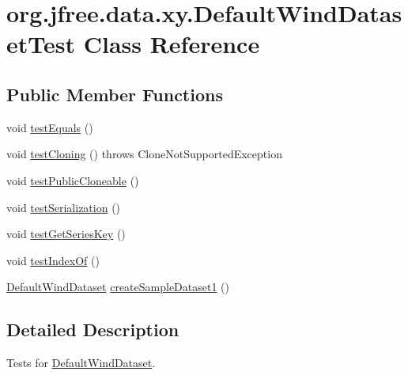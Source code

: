 \hypertarget{classorg_1_1jfree_1_1data_1_1xy_1_1_default_wind_dataset_test}{}\section{org.\+jfree.\+data.\+xy.\+Default\+Wind\+Dataset\+Test Class Reference}
\label{classorg_1_1jfree_1_1data_1_1xy_1_1_default_wind_dataset_test}
\subsection*{Public Member Functions}
\begin{DoxyCompactItemize}
\item 
void \mbox{\hyperlink{classorg_1_1jfree_1_1data_1_1xy_1_1_default_wind_dataset_test_abe0eb748788ebbc2cc8e919dec729cb5}{test\+Equals}} ()
\item 
void \mbox{\hyperlink{classorg_1_1jfree_1_1data_1_1xy_1_1_default_wind_dataset_test_a4309780877d71caf49d9fdcba3f53827}{test\+Cloning}} ()  throws Clone\+Not\+Supported\+Exception 
\item 
void \mbox{\hyperlink{classorg_1_1jfree_1_1data_1_1xy_1_1_default_wind_dataset_test_ae27efdcae80a0b05325d29e5b90580a1}{test\+Public\+Cloneable}} ()
\item 
void \mbox{\hyperlink{classorg_1_1jfree_1_1data_1_1xy_1_1_default_wind_dataset_test_af7359322d733fc31f7e4b0d6961b5f5d}{test\+Serialization}} ()
\item 
void \mbox{\hyperlink{classorg_1_1jfree_1_1data_1_1xy_1_1_default_wind_dataset_test_a6428465330487a2876dfcfe0f0191f0d}{test\+Get\+Series\+Key}} ()
\item 
void \mbox{\hyperlink{classorg_1_1jfree_1_1data_1_1xy_1_1_default_wind_dataset_test_a4ccfed828746ad2006d00b8e9dd9d849}{test\+Index\+Of}} ()
\item 
\mbox{\hyperlink{classorg_1_1jfree_1_1data_1_1xy_1_1_default_wind_dataset}{Default\+Wind\+Dataset}} \mbox{\hyperlink{classorg_1_1jfree_1_1data_1_1xy_1_1_default_wind_dataset_test_a491cc8d7093c4e448dc0197bc0acf6cf}{create\+Sample\+Dataset1}} ()
\end{DoxyCompactItemize}


\subsection{Detailed Description}
Tests for \mbox{\hyperlink{classorg_1_1jfree_1_1data_1_1xy_1_1_default_wind_dataset}{Default\+Wind\+Dataset}}. 

